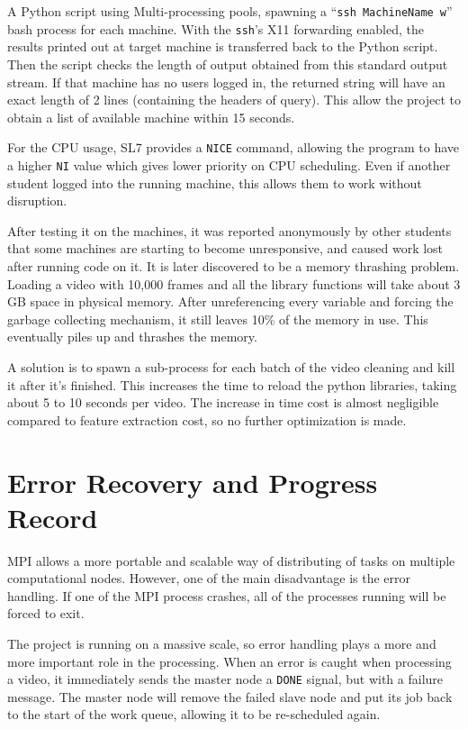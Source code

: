 \documentclass[bsc,logo,twoside,fullspacing,parskip]{infthesis}
\begin{document}
A Python script using Multi-processing pools, spawning a ``{\tt ssh MachineName w}'' bash process for each machine.
With the {\tt ssh}'s X11 forwarding enabled, the results printed out at target machine is transferred back to the Python script. 
Then the script checks the length of output obtained from this standard output stream. 
If that machine has no users logged in, the returned string will have an exact length of 2 lines (containing the headers of query). 
This allow the project to obtain a list of available machine within 15 seconds.

For the CPU usage, SL7 provides a {\tt NICE} command, allowing the program to have a higher {\tt NI} value which gives lower priority on CPU scheduling. Even if another student logged into the running machine, this allows them to work without disruption.

After testing it on the machines, it was reported anonymously by other students that some machines are starting to become unresponsive, and caused work lost after running code on it. It is later discovered to be a memory thrashing problem.
Loading a video with 10,000 frames and all the library functions will take about 3 GB space in physical memory. 
After unreferencing every variable and forcing the garbage collecting mechanism, it still leaves 10\% of the memory in use. This eventually piles up and thrashes the memory. 

A solution is to spawn a sub-process for each batch of the video cleaning and kill it after it's finished. 
This increases the time to reload the python libraries, taking about 5 to 10 seconds per video. 
The increase in time cost is almost negligible compared to feature extraction cost, so no further optimization is made. 


\section{Error Recovery and Progress Record}

MPI allows a more portable and scalable way of distributing of tasks on multiple computational nodes.
However, one of the main disadvantage is the error handling. 
If one of the MPI process crashes, all of the processes running will be forced to exit.

The project is running on a massive scale, so error handling plays a more and more important role in the processing. 
When an error is caught when processing a video, it immediately sends the master node a {\tt DONE} signal, but with a failure message. The master node will remove the failed slave node and put its job back to the start of the work queue, allowing it to be re-scheduled again.
\end{document}
